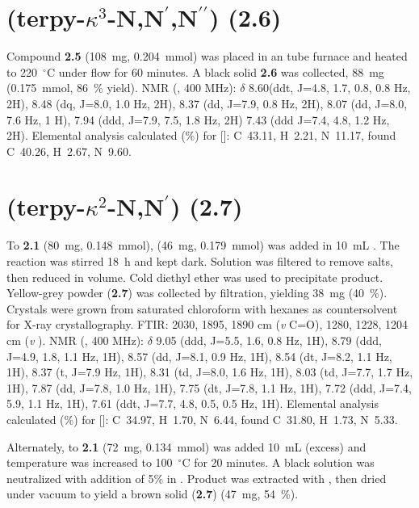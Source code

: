 \section{(terpy-$\kappa^3$-N,N$^\prime$,N$^{\prime \prime}$) (\textbf{2.6})} \label{sec.c6}
Compound \textbf{2.5} (108~mg, 0.204~mmol) was placed in an tube furnace and heated to 220~$^\circ$C under  flow for 60 minutes. A black solid \textbf{2.6} was collected, 88~mg (0.175~mmol, 86~\% yield).  NMR (, 400 MHz): $\delta$ 8.60(ddt, J=4.8, 1.7, 0.8, 0.8 Hz, 2H), 8.48 (dq, J=8.0, 1.0 Hz, 2H), 8.37 (dd, J=7.9, 0.8 Hz, 2H), 8.07 (dd, J=8.0, 7.6 Hz, 1 H), 7.94 (ddd, J=7.9, 7.5, 1.8 Hz, 2H) 7.43 (ddd J=7.4, 4.8, 1.2 Hz, 2H). Elemental analysis calculated (\%) for []: C~43.11, H~2.21, N~11.17, found C~40.26, H~2.67, N~9.60.

\section{(terpy-$\kappa^2$-N,N$^\prime$) (\textbf{2.7})}\label{sec.c7}
To \textbf{2.1} (80~mg, 0.148~mmol),  (46~mg, 0.179~mmol) was added in 10~mL . The reaction was stirred 18~h and kept dark. Solution was filtered to remove salts, then reduced in volume. Cold diethyl ether was used to precipitate product. Yellow-grey powder (\textbf{2.7}) was collected by filtration, yielding 38~mg (40~\%). Crystals were grown from saturated chloroform with hexanes as countersolvent for X-ray crystallography. FTIR: 2030, 1895, 1890 cm (\textit{v} C=O), 1280, 1228, 1204 cm (\textit{v} ).  NMR (, 400 MHz): $\delta$ 9.05 (ddd, J=5.5, 1.6, 0.8 Hz, 1H), 8.79 (ddd, J=4.9, 1.8, 1.1 Hz, 1H), 8.57 (dd, J=8.1, 0.9 Hz, 1H), 8.54 (dt, J=8.2, 1.1 Hz, 1H), 8.37 (t, J=7.9 Hz, 1H), 8.31 (td, J=8.0, 1.6 Hz, 1H), 8.03 (td, J=7.7, 1.7 Hz, 1H), 7.87 (dd, J=7.8, 1.0 Hz, 1H), 7.75 (dt, J=7.8, 1.1 Hz, 1H), 7.72 (ddd, J=7.4, 5.9, 1.1 Hz, 1H), 7.61 (ddt, J=7.7, 4.8, 0.5, 0.5 Hz, 1H).  Elemental analysis calculated (\%) for []: C~34.97, H~1.70, N~6.44, found C~31.80, H~1.73, N~5.33.

Alternately, to \textbf{2.1} (72~mg, 0.134~mmol) was added 10~mL  (excess) and temperature was increased to 100~$^\circ$C for 20 minutes. A black solution was neutralized with addition of 5\%  in . Product was extracted with , then dried under vacuum to yield a brown solid (\textbf{2.7}) (47~mg, 54~\%).

